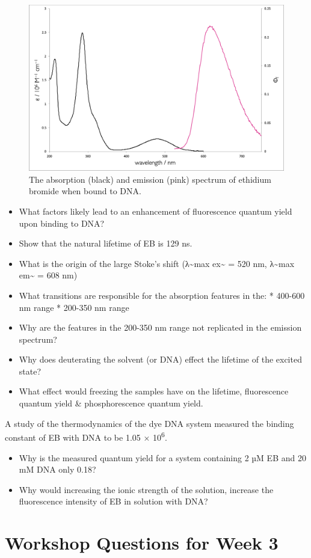 \documentclass[
]{book}
\begin{document}
\begin{figure}

{\centering \includegraphics[width=0.3\linewidth]{images/ethidiumspectra} 

}

\caption{The absorption (black) and emission (pink) spectrum of ethidium bromide when bound to DNA.}\label{fig:ethidiumspectra}
\end{figure}

\begin{itemize}
\item
  What factors likely lead to an enhancement of fluorescence quantum yield upon binding to DNA?
\item
  Show that the natural lifetime of EB is 129 ns.
\item
  What is the origin of the large Stoke's shift (λ\textasciitilde max ex\textasciitilde{} = 520 nm, λ\textasciitilde max em\textasciitilde{} = 608 nm)
\item
  What transitions are responsible for the absorption features in the:
  * 400-600 nm range
  * 200-350 nm range
\item
  Why are the features in the 200-350 nm range not replicated in the emission spectrum?
\item
  Why does deuterating the solvent (or DNA) effect the lifetime of the excited state?
\item
  What effect would freezing the samples have on the lifetime, fluorescence quantum yield \& phosphorescence quantum yield.
\end{itemize}

A study of the thermodynamics of the dye DNA system measured the binding constant of EB with DNA to be 1.05 × 10\textsuperscript{6}.

\begin{itemize}
\item
  Why is the measured quantum yield for a system containing 2 µM EB and 20 mM DNA only 0.18?
\item
  Why would increasing the ionic strength of the solution, increase the fluorescence intensity of EB in solution with DNA?
\end{itemize}

\hypertarget{ch:Workshop3}{%
\chapter{Workshop Questions for Week 3}\label{ch:Workshop3}}
\end{document}
